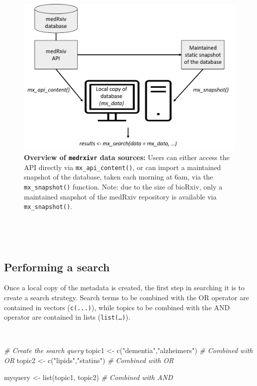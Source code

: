 \documentclass[a4paper, twoside]{templates/ociamthesis}
\newenvironment{Shaded}{\begin{snugshade}}{\end{snugshade}}
\newcommand{\CommentTok}[1]{\textcolor[rgb]{0.56,0.35,0.01}{\textit{#1}}}
\newcommand{\FunctionTok}[1]{\textcolor[rgb]{0.00,0.00,0.00}{#1}}
\newcommand{\NormalTok}[1]{#1}
\newcommand{\OtherTok}[1]{\textcolor[rgb]{0.56,0.35,0.01}{#1}}
\newcommand{\StringTok}[1]{\textcolor[rgb]{0.31,0.60,0.02}{#1}}
\renewenvironment{Shaded}
{
  \vspace{4pt}%
  \begin{snugshade}%
}{%
  \end{snugshade}%
  \vspace{4pt}%
}
\begin{document}
\begin{figure}[!h]
\includegraphics[width=1\linewidth]{figures/sys-rev-tools/data_sources} \caption[Overview of \texttt{medrxivr} data sources]{\textbf{Overview of \texttt{medrxivr} data sources:} Users can either access the API directly via \texttt{mx\_api\_content()}, or can import a maintained snapshot of the database, taken each morning at 6am, via the \texttt{mx\_snapshot()} function. Note: due to the size of bioRxiv, only a maintained snapshot of the medRxiv repository is available via \texttt{mx\_snapshot()}.}\label{fig:medrxivr-data-sources}
\end{figure}

~

~

\hypertarget{performing-a-search}{%
\subsection{Performing a search}\label{performing-a-search}}

Once a local copy of the metadata is created, the first step in searching it is to create a search strategy. Search terms to be combined with the OR operator are contained in vectors (\texttt{c(...)}), while topics to be combined with the AND operator are contained in lists (\texttt{list(\ldots{})}).

~

\begin{Shaded}
\begin{Highlighting}[]
\CommentTok{\# Create the search query}
\NormalTok{topic1  }\OtherTok{\textless{}{-}} \FunctionTok{c}\NormalTok{(}\StringTok{"dementia"}\NormalTok{,}\StringTok{"alzheimer\textquotesingle{}s"}\NormalTok{)  }\CommentTok{\# Combined with OR}
\NormalTok{topic2  }\OtherTok{\textless{}{-}} \FunctionTok{c}\NormalTok{(}\StringTok{"lipids"}\NormalTok{,}\StringTok{"statins"}\NormalTok{)        }\CommentTok{\# Combined with OR}

\NormalTok{myquery }\OtherTok{\textless{}{-}} \FunctionTok{list}\NormalTok{(topic1, topic2)         }\CommentTok{\# Combined with AND}
\end{Highlighting}
\end{Shaded}
\end{document}
